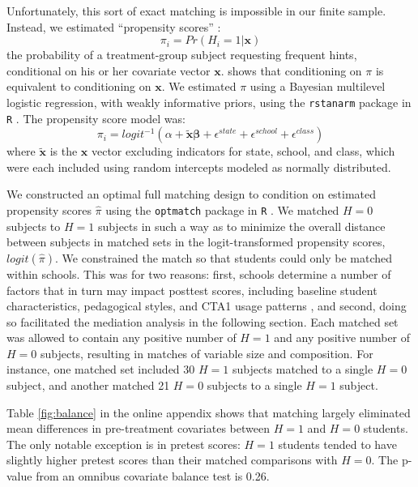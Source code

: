 \documentclass{article}
\begin{document}
Unfortunately, this sort of exact matching is impossible in our finite
sample.
Instead, we estimated ``propensity scores'' \citep{rosenbaum1983central}:
\begin{equation*}
\pi_i=Pr(H_i=1|\bm{x})
\end{equation*}
the probability of a treatment-group subject requesting frequent hints, conditional on
his or her covariate vector $\bm{x}$.
\citet{rosenbaum1983central} shows that conditioning on $\pi$ is
equivalent to conditioning on $\bm{x}$.
We estimated $\pi$ using a Bayesian multilevel logistic regression,
with weakly informative priors, using the \texttt{rstanarm} package in
\texttt{R} \citep{rstanarm}.
The propensity score model was:
\begin{equation*}
\pi_i=logit^{-1}(\alpha+\bm{\tilde{x}}\bm{\beta}+\epsilon^{state}+\epsilon^{school}+\epsilon^{class})
\end{equation*}
where $\bm{\tilde{x}}$ is the $\bm{x}$ vector excluding indicators for
state, school, and class, which were each included using random
intercepts modeled as normally distributed.

We constructed an optimal full matching design \citep{hansen2004} to
condition on estimated propensity scores $\hat{\pi}$ using the
\texttt{optmatch} package in \texttt{R} \citep{optmatch}.
We matched $H=0$ subjects to $H=1$ subjects in such a way as
to minimize the overall distance between subjects in matched sets in
the logit-transformed propensity scores, $logit(\hat{\pi})$.
We constrained the match so that students could only be matched within
schools.
This was for two reasons: first, schools determine a number of factors
that in turn may impact posttest scores, including baseline
student characteristics, pedagogical styles, and CTA1 usage patterns
\citep[see][]{descriptivePaper}, and second, doing so facilitated the mediation
analysis in the following section.
Each matched set was allowed to contain any positive number of $H=1$
and any positive number of $H=0$ subjects, resulting in matches of
variable size and composition.
For instance, one matched set included 30 $H=1$ subjects matched to a
single $H=0$ subject, and another matched 21 $H=0$ subjects to a
single $H=1$ subject.

Table \ref{fig:balance} in the online appendix shows that
matching largely eliminated mean differences in pre-treatment
covariates between $H=1$ and $H=0$ students.
The only notable exception is in pretest scores: $H=1$ students tended
to have slightly higher pretest scores than their matched comparisons
with $H=0$.
The p-value from an omnibus covariate balance test
\citep{covBal} is 0.26.
\end{document}
